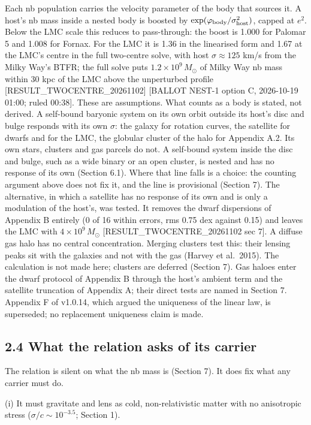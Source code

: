 \documentclass[
  10pt,
]{article}
\begin{document}
Each nb population carries the velocity parameter of the body that sources it. A host's nb mass inside a nested body is boosted by $\exp(\varphi_{\rm body}/\sigma_{\rm host}^2)$, capped at $e^2$. Below the LMC scale this reduces to pass-through: the boost is 1.000 for Palomar 5 and 1.008 for Fornax. For the LMC it is 1.36 in the linearised form and 1.67 at the LMC's centre in the full two-centre solve, with host $\sigma\approx125$ km/s from the Milky Way's BTFR; the full solve puts $1.2\times10^9\,M_\odot$ of Milky Way nb mass within 30 kpc of the LMC above the unperturbed profile {[}RESULT\_TWOCENTRE\_20261102{]} {[}BALLOT NEST-1 option C, 2026-10-19 01:00; ruled 00:38{]}. These are assumptions. What counts as a body is stated, not derived. A self-bound baryonic system on its own orbit outside its host's disc and bulge responds with its own $\sigma$: the galaxy for rotation curves, the satellite for dwarfs and for the LMC, the globular cluster of the halo for Appendix A.2. Its own stars, clusters and gas parcels do not. A self-bound system inside the disc and bulge, such as a wide binary or an open cluster, is nested and has no response of its own (Section 6.1). Where that line falls is a choice: the counting argument above does not fix it, and the line is provisional (Section 7). The alternative, in which a satellite has no response of its own and is only a modulation of the host's, was tested. It removes the dwarf dispersions of Appendix B entirely (0 of 16 within errors, rms 0.75 dex against 0.15) and leaves the LMC with $4\times10^9\,M_\odot$ {[}RESULT\_TWOCENTRE\_20261102 sec 7{]}. A diffuse gas halo has no central concentration. Merging clusters test this: their lensing peaks sit with the galaxies and not with the gas (Harvey et al.~2015). The calculation is not made here; clusters are deferred (Section 7). Gas haloes enter the dwarf protocol of Appendix B through the host's ambient term and the satellite truncation of Appendix A; their direct tests are named in Section 7. Appendix F of v1.0.14, which argued the uniqueness of the linear law, is superseded; no replacement uniqueness claim is made.

\subsection{2.4 What the relation asks of its carrier}\label{carrier}

The relation is silent on what the nb mass is (Section 7). It does fix what any carrier must do.

(i) It must gravitate and lens as cold, non-relativistic matter with no anisotropic stress ($\sigma/c\sim10^{-3.5}$; Section 1).
\end{document}
